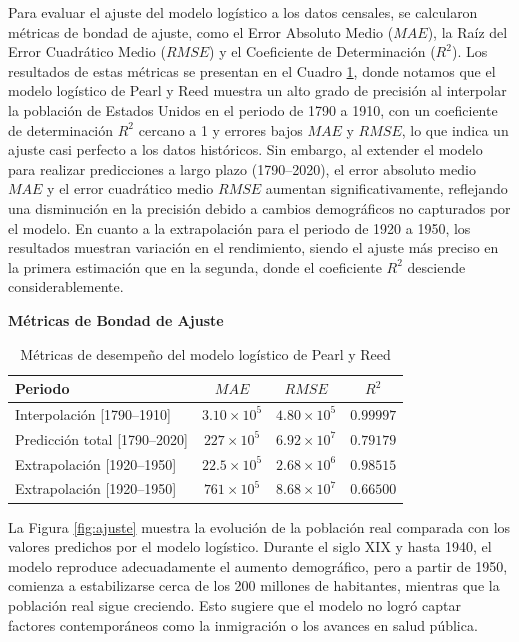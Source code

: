 \documentclass[12pt]{article}
\begin{document}
Para evaluar el ajuste del modelo logístico a los datos censales, se calcularon métricas de bondad de ajuste, como el Error Absoluto Medio ($MAE$), la Raíz del Error Cuadrático Medio ($RMSE$) y el Coeficiente de Determinación ($R^2$). Los resultados de estas métricas se presentan en el Cuadro \ref{tab:metricas_logistica}, donde notamos que el modelo logístico de Pearl y Reed muestra un alto grado de precisión al interpolar la población de Estados Unidos en el periodo de 1790 a 1910, con un coeficiente de determinación $R^2$ cercano a 1 y errores bajos $MAE$ y $RMSE$, lo que indica un ajuste casi perfecto a los datos históricos. Sin embargo, al extender el modelo para realizar predicciones a largo plazo (1790–2020), el error absoluto medio $MAE$ y el error cuadrático medio $RMSE$ aumentan significativamente, reflejando una disminución en la precisión debido a cambios demográficos no capturados por el modelo. En cuanto a la extrapolación para el periodo de 1920 a 1950, los resultados muestran variación en el rendimiento, siendo el ajuste más preciso en la primera estimación que en la segunda, donde el coeficiente $R^2$ desciende considerablemente.

\begin{table}[h]
\centering
\textbf{Métricas de Bondad de Ajuste}\\
\vspace{0.4cm}
\begin{tabular}{lccc}
\toprule
\textbf{Periodo} & $MAE$ & $RMSE$ & \textbf{$R^2$} \\
\midrule
Interpolación [1790--1910] & $3.10 \times 10^5$ & $4.80 \times 10^5$ & $0.99997$ \\

Predicción total [1790--2020] & $227 \times 10^5$ & $6.92 \times 10^7$ & $0.79179$ \\

Extrapolación [1920--1950] & $22.5 \times 10^5$ & $2.68 \times 10^6$ & $0.98515$ \\

Extrapolación [1920--1950] & $761 \times 10^5$ & $8.68 \times 10^7$ & $0.66500$ \\
\bottomrule
\end{tabular}
\caption{Métricas de desempeño del modelo logístico de Pearl y Reed}
\label{tab:metricas_logistica}
\end{table}

\newpage
La Figura \ref{fig:ajuste} muestra la evolución de la población real comparada con los valores predichos por el modelo logístico. Durante el siglo XIX y hasta 1940, el modelo reproduce adecuadamente el aumento demográfico, pero a partir de 1950, comienza a estabilizarse cerca de los 200 millones de habitantes, mientras que la población real sigue creciendo. Esto sugiere que el modelo no logró captar factores contemporáneos como la inmigración o los avances en salud pública.
\end{document}
